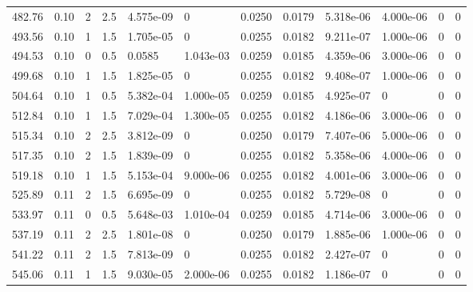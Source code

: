 \documentclass[preview]{standalone}
\begin{document}
{{{\begin{tabular}{L{1.2cm}C{1.2cm} C{0.3cm}C{0.5cm} C{1.4cm}C{1.4cm} C{1.4cm}C{1.4cm} C{1.6cm}C{1.6cm} C{1.6cm}C{1.6cm}}
  482.76  &  0.10  & 2     & 2.5 &  4.575e-09  & 0  &  0.0250&   0.0179& 5.318e-06 & 4.000e-06   &  0 & 0  \\ 
  493.56  &  0.10  & 1     & 1.5 &  1.705e-05  & 0  &  0.0255&   0.0182& 9.211e-07 & 1.000e-06   &  0 & 0  \\ 
  494.53  &  0.10  & 0     & 0.5 &  0.0585  & 1.043e-03  &  0.0259&   0.0185& 4.359e-06 & 3.000e-06   &  0 & 0  \\ 
  499.68  &  0.10  & 1     & 1.5 &  1.825e-05  & 0  &  0.0255&   0.0182& 9.408e-07 & 1.000e-06   &  0 & 0  \\ 
  504.64  &  0.10  & 1     & 0.5 &  5.382e-04  & 1.000e-05  &  0.0259&   0.0185& 4.925e-07 & 0   &  0 & 0  \\ 
  512.84  &  0.10  & 1     & 1.5 &  7.029e-04  & 1.300e-05  &  0.0255&   0.0182& 4.186e-06 & 3.000e-06   &  0 & 0  \\ 
  515.34  &  0.10  & 2     & 2.5 &  3.812e-09  & 0  &  0.0250&   0.0179& 7.407e-06 & 5.000e-06   &  0 & 0  \\ 
  517.35  &  0.10  & 2     & 1.5 &  1.839e-09  & 0  &  0.0255&   0.0182& 5.358e-06 & 4.000e-06   &  0 & 0  \\ 
  519.18  &  0.10  & 1     & 1.5 &  5.153e-04  & 9.000e-06  &  0.0255&   0.0182& 4.001e-06 & 3.000e-06   &  0 & 0  \\ 
  525.89  &  0.11  & 2     & 1.5 &  6.695e-09  & 0  &  0.0255&   0.0182& 5.729e-08 & 0   &  0 & 0  \\ 
  533.97  &  0.11  & 0     & 0.5 &  5.648e-03  & 1.010e-04  &  0.0259&   0.0185& 4.714e-06 & 3.000e-06   &  0 & 0  \\ 
  537.19  &  0.11  & 2     & 2.5 &  1.801e-08  & 0  &  0.0250&   0.0179& 1.885e-06 & 1.000e-06   &  0 & 0  \\ 
  541.22  &  0.11  & 2     & 1.5 &  7.813e-09  & 0  &  0.0255&   0.0182& 2.427e-07 & 0   &  0 & 0  \\ 
  545.06  &  0.11  & 1     & 1.5 &  9.030e-05  & 2.000e-06  &  0.0255&   0.0182& 1.186e-07 & 0   &  0 & 0  \\ 
\hline 
\end{tabular} 

}}}
\end{document}
